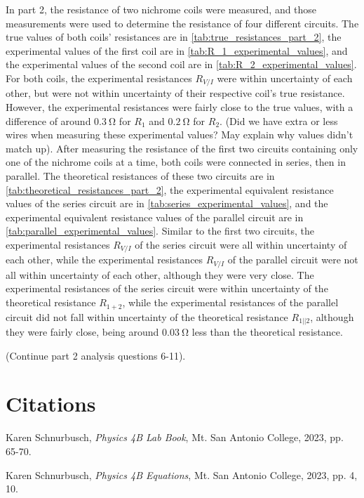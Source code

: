 \documentclass[12pt]{iopart} %
\gdef\units#1{~\mathrm{#1}}
\begin{document}
In part 2, the resistance of two nichrome coils were measured, and those measurements were used to determine the resistance of four different circuits.
The true values of both coils' resistances are in \ref{tab:true_resistances_part_2}, the experimental values of the first coil are in \ref{tab:R_1_experimental_values}, and the experimental values of the second coil are in \ref{tab:R_2_experimental_values}.
For both coils, the experimental resistances $R_{V/I}$ were within uncertainty of each other, but were not within uncertainty of their respective coil's true resistance.
However, the experimental resistances were fairly close to the true values, with a difference of around $0.3 \units{\Omega}$ for $R_1$ and $0.2 \units{\Omega}$ for $R_2$.
(Did we have extra or less wires when measuring these experimental values? May explain why values didn't match up).
After measuring the resistance of the first two circuits containing only one of the nichrome coils at a time, both coils were connected in series, then in parallel.
The theoretical resistances of these two circuits are in \ref{tab:theoretical_resistances_part_2}, the experimental equivalent resistance values of the series circuit are in \ref{tab:series_experimental_values}, and the experimental equivalent resistance values of the parallel circuit are in \ref{tab:parallel_experimental_values}.
Similar to the first two circuits, the experimental resistances $R_{V/I}$ of the series circuit were all within uncertainty of each other, while the experimental resistances $R_{V/I}$ of the parallel circuit were not all within uncertainty of each other, although they were very close.
The experimental resistances of the series circuit were within uncertainty of the theoretical resistance $R_{1+2}$, while the experimental resistances of the parallel circuit did not fall within uncertainty of the theoretical resistance $R_{1||2}$, although they were fairly close, being around $0.03 \units{\Omega}$ less than the theoretical resistance.

(Continue part 2 analysis questions 6-11).

\section{Citations}

\begin{thebibliography}{9}

  Karen Schnurbusch,
  \textit{Physics 4B Lab Book},
  Mt. San Antonio College,
  2023,
  pp. 65-70.

  Karen Schnurbusch,
  \textit{Physics 4B Equations},
  Mt. San Antonio College,
  2023,
  pp. 4, 10.

\end{thebibliography}
\end{document}
